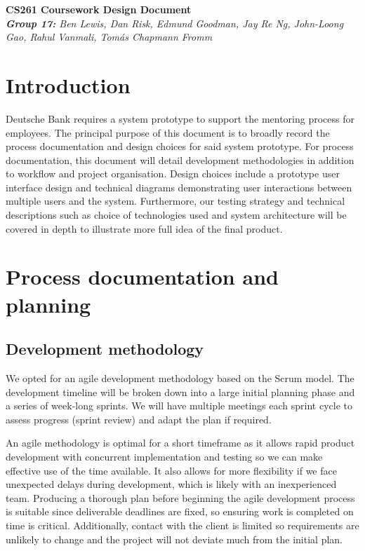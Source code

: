 \documentclass[10pt]{article}
\begin{document}
\begin{center}
    \Huge\textbf{CS261 Coursework Design Document}\\
    \vspace{2mm}
    \large{\textit{\textbf{Group 17:} Ben Lewis, Dan Risk, Edmund Goodman,
    Jay Re Ng, John-Loong Gao, Rahul Vanmali, Tomás Chapmann Fromm}}
\end{center}


\section{Introduction}
Deutsche Bank requires a system prototype to support the mentoring process for
employees. The principal purpose of this document is to broadly record the
process documentation and design choices for said system prototype. For process
documentation, this document will detail development methodologies in addition
to workflow and project organisation. Design choices include a prototype user
interface design and technical diagrams demonstrating user interactions between
multiple users and the system. Furthermore, our testing strategy and technical
descriptions such as choice of technologies used and system architecture will be
covered in depth to illustrate more full idea of the final product.

\section{Process documentation and planning}
\subsection{Development methodology}
We opted for an agile development methodology based on the Scrum model. The
development timeline will be broken down into a large initial planning phase and
a series of week-long sprints. We will have multiple meetings each sprint cycle
to assess progress (sprint review) and adapt the plan if required.

An agile methodology is optimal for a short timeframe as it allows rapid product
development with concurrent implementation and testing so we can make effective
use of the time available. It also allows for more flexibility if we face
unexpected delays during development, which is likely with an inexperienced
team. Producing a thorough plan before beginning the agile development process
is suitable since deliverable deadlines are fixed, so ensuring work is completed
on time is critical. Additionally, contact with the client is limited so
requirements are unlikely to change and the project will not deviate much from
the initial plan.
\end{document}
